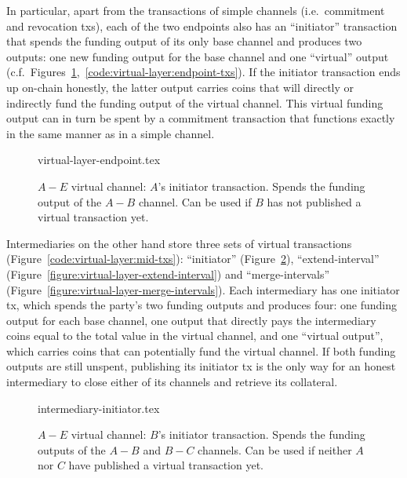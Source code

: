   In particular, apart from the transactions of simple channels (i.e.\
  commitment and revocation txs), each of the two
  endpoints also has an ``initiator'' transaction that spends the funding output
  of its only base channel and produces two outputs: one new funding output for
  the base channel and one ``virtual'' output (c.f.\
  Figures~\ref{figure:virtual-layer-endpoint},~\ref{code:virtual-layer:endpoint-txs}).
  If the initiator transaction ends up on-chain honestly, the latter output
  carries coins that will directly or indirectly fund the funding output of the
  virtual channel. This virtual funding output can in turn be spent by a
  commitment transaction that functions exactly in the same manner as in a
  simple channel.

  \begin{figure}
    {virtual-layer-endpoint.tex}
    \caption{$A-E$ virtual channel: $A$'s initiator transaction. Spends the
    funding output of the $A-B$ channel. Can be used if $B$ has not published
    a virtual transaction yet.}
    \label{figure:virtual-layer-endpoint}
  \end{figure}

  Intermediaries on the other hand store three sets of virtual transactions
  (Figure~\ref{code:virtual-layer:mid-txs}): ``initiator''
  (Figure~\ref{figure:virtual-layer-initiator}), ``extend-interval''
  (Figure~\ref{figure:virtual-layer-extend-interval}) and ``merge-intervals''
  (Figure~\ref{figure:virtual-layer-merge-intervals}). Each intermediary has one
  initiator tx, which spends the party's two funding outputs and produces four:
  one funding output for each base channel, one output that directly pays the
  intermediary coins equal to the total value in the virtual channel, and one
  ``virtual output'', which carries coins that can potentially fund the virtual
  channel. If both funding outputs are still unspent, publishing its initiator
  tx is the only way for an honest intermediary to close either of its channels
  and retrieve its collateral.

  \begin{figure}
    {intermediary-initiator.tex}
    \caption{$A-E$ virtual channel: $B$'s initiator transaction. Spends the
    funding outputs of the $A-B$ and $B-C$ channels. Can be used if neither
    $A$ nor $C$ have published a virtual transaction yet.}
    \label{figure:virtual-layer-initiator}
  \end{figure}

